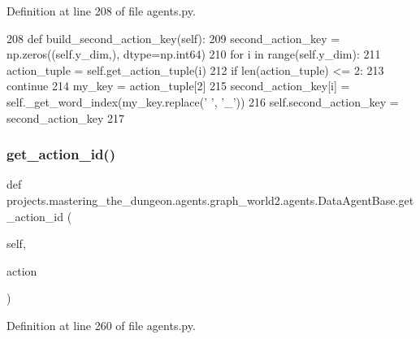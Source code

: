 Definition at line 208 of file agents.\+py.


\begin{DoxyCode}
208     \textcolor{keyword}{def }build\_second\_action\_key(self):
209         second\_action\_key = np.zeros((self.y\_dim,), dtype=np.int64)
210         \textcolor{keywordflow}{for} i \textcolor{keywordflow}{in} range(self.y\_dim):
211             action\_tuple = self.get\_action\_tuple(i)
212             \textcolor{keywordflow}{if} len(action\_tuple) <= 2:
213                 \textcolor{keywordflow}{continue}
214             my\_key = action\_tuple[2]
215             second\_action\_key[i] = self.\_get\_word\_index(my\_key.replace(\textcolor{stringliteral}{' '}, \textcolor{stringliteral}{'\_'}))
216         self.second\_action\_key = second\_action\_key
217 
\end{DoxyCode}
\mbox{\label{classprojects_1_1mastering__the__dungeon_1_1agents_1_1graph__world2_1_1agents_1_1DataAgentBase_a0a37a92ad6bc9229f6ffa273fbcabf2b}} 
\subsubsection{\texorpdfstring{get\+\_\+action\+\_\+id()}{get\_action\_id()}}
{\footnotesize\ttfamily def projects.\+mastering\+\_\+the\+\_\+dungeon.\+agents.\+graph\+\_\+world2.\+agents.\+Data\+Agent\+Base.\+get\+\_\+action\+\_\+id (\begin{DoxyParamCaption}\item[{}]{self,  }\item[{}]{action }\end{DoxyParamCaption})}



Definition at line 260 of file agents.\+py.


